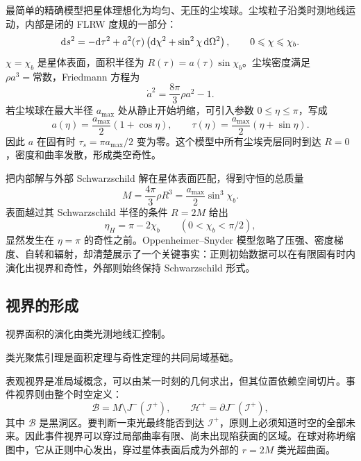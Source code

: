 最简单的精确模型把星体理想化为均匀、无压的尘埃球。尘埃粒子沿类时测地线运动，内部是闭的 FLRW 度规的一部分：
\[
    \dd s^2=-\dd\tau^2+a^2(\tau)
    \left(\dd\chi^2+\sin^2\chi\,\dd\Omega^2\right),
    \qquad 0\leqslant\chi\leqslant\chi_b.
\]
$\chi=\chi_b$ 是星体表面，面积半径为 $R(\tau)=a(\tau)\sin\chi_b$。尘埃密度满足 $\rho a^3=\text{常数}$，Friedmann 方程为
\[
    \dot a^2=\frac{8\pi}{3}\rho a^2-1.
\]
若尘埃球在最大半径 $a_{\max}$ 处从静止开始坍缩，可引入参数 $0\leqslant\eta\leqslant\pi$，写成
\[
    a(\eta)=\frac{a_{\max}}{2}(1+\cos\eta),\qquad
    \tau(\eta)=\frac{a_{\max}}{2}(\eta+\sin\eta).
\]
因此 $a$ 在固有时 $\tau_s=\pi a_{\max}/2$ 变为零。这个模型中所有尘埃壳层同时到达 $R=0$，密度和曲率发散，形成类空奇性。

把内部解与外部 Schwarzschild 解在星体表面匹配，得到守恒的总质量
\[
    M=\frac{4\pi}{3}\rho R^3
     =\frac{a_{\max}}{2}\sin^3\chi_b.
\]
表面越过其 Schwarzschild 半径的条件 $R=2M$ 给出
\[
    \eta_H=\pi-2\chi_b\qquad(0<\chi_b<\pi/2),
\]
显然发生在 $\eta=\pi$ 的奇性之前。Oppenheimer--Snyder 模型忽略了压强、密度梯度、自转和辐射，却清楚展示了一个关键事实：正则初始数据可以在有限固有时内演化出视界和奇性，外部则始终保持 Schwarzschild 形式。

\subsection{视界的形成}

视界面积的演化由类光测地线汇控制。

类光聚焦引理是面积定理与奇性定理的共同局域基础。

表观视界是准局域概念，可以由某一时刻的几何求出，但其位置依赖空间切片。事件视界则由整个时空定义：
\[
    \mathcal B=M\setminus J^-(\mathscr I^+),\qquad
    \mathcal H^+=\partial J^-(\mathscr I^+),
\]
其中 $\mathcal B$ 是黑洞区。要判断一束光最终能否到达 $\mathscr I^+$，原则上必须知道时空的全部未来。因此事件视界可以穿过局部曲率有限、尚未出现陷获面的区域。在球对称坍缩图中，它从正则中心发出，穿过星体表面后成为外部的 $r=2M$ 类光超曲面。

